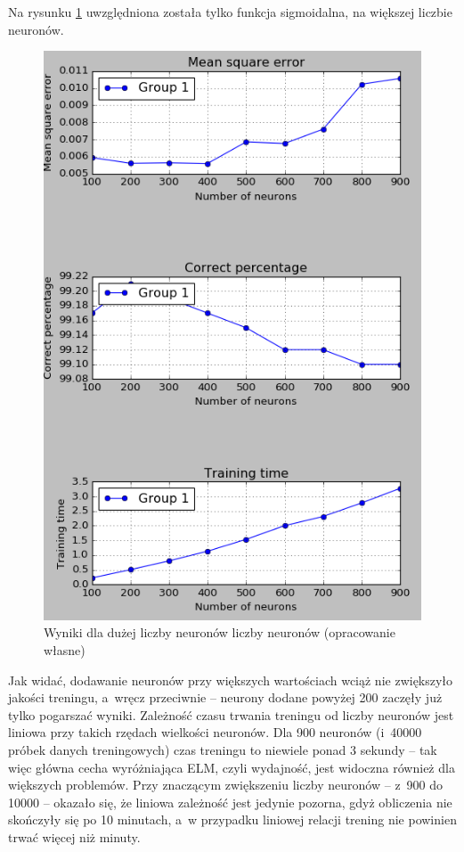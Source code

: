 \documentclass[pl]{minipw} %
\begin{document}
Na rysunku \ref{wyniki_dota2_python_performance} uwzględniona została tylko funkcja sigmoidalna, na większej liczbie neuronów.
\begin{figure}[H]
\centering
\includegraphics[width=\textwidth]{wyniki_dota2_python_performance.png}
\caption[Wyniki dla dużej liczby neuronów liczby neuronów]{Wyniki dla dużej liczby neuronów liczby neuronów (opracowanie własne)}
\label{wyniki_dota2_python_performance}
\end{figure}
Jak widać, dodawanie neuronów przy większych wartościach wciąż nie zwiększyło jakości treningu, a~wręcz przeciwnie -- neurony dodane powyżej 200 zaczęły już tylko pogarszać wyniki. Zależność czasu trwania treningu od liczby neuronów jest liniowa przy takich rzędach wielkości neuronów. Dla 900 neuronów (i~40000 próbek danych treningowych) czas treningu to niewiele ponad 3 sekundy -- tak więc główna cecha wyróżniająca ELM, czyli wydajność, jest widoczna również dla większych problemów. Przy znaczącym zwiększeniu liczby neuronów -- z~900 do 10000 -- okazało się, że liniowa zależność jest jedynie pozorna, gdyż obliczenia nie skończyły się po 10 minutach, a~w przypadku liniowej relacji trening nie powinien trwać więcej niż minuty.
\label{10000_dota2}
\end{document}
